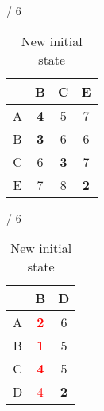 \documentclass[a4paper, 11 pt, article, accentcolor=tud7b]{tudreport}
\begin{document}
\begin{table}[h]
\begin{subtable}[b]{\textwidth / 6}
	    \begin{tabular}{| c | c | c | c |}
	    \hline
	      & B                   & C           & E           \\ \hline
	    A & \textbf{4}          & 5           & 7           \\ \hline
	    B & \textbf{3}          & 6           & 6           \\ \hline
	    C & 6                   & \textbf{3}  & 7           \\ \hline
	    E & 7                   & 8           & \textbf{2}  \\ \hline
	    \end{tabular}
	    \caption{$D^{D}$}
	  \end{subtable}
	  \hfill
	  \begin{subtable}[b]{\textwidth / 6}
	    \begin{tabular}{| c | c | c |}
	    \hline
	      & B                   & D                    \\ \hline
	    A & \textbf{\textcolor{red}{2}} & 6            \\ \hline
	    B & \textbf{\textcolor{red}{1}} & 5            \\ \hline
	    C & \textbf{\textcolor{red}{4}} & 5            \\ \hline
	    D & \textcolor{red}{4}          & \textbf{2}   \\ \hline
	    \end{tabular}
	    \caption{$D^{E}$}
	  \end{subtable}
	  \caption{New initial state}
	\end{table}
	
\end{document}
